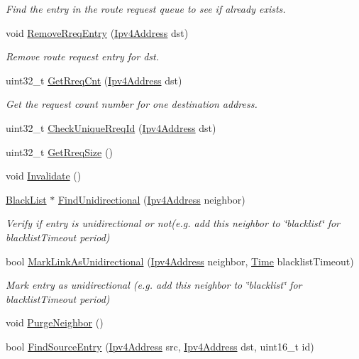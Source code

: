 \begin{DoxyCompactItemize}
\begin{DoxyCompactList}\small\item\em Find the entry in the route request queue to see if already exists. \end{DoxyCompactList}\item 
void \hyperlink{classns3_1_1dsr_1_1DsrRreqTable_a6cb38060b3bfbd31cef7c6ba1e9283df}{Remove\+Rreq\+Entry} (\hyperlink{classns3_1_1Ipv4Address}{Ipv4\+Address} dst)
\begin{DoxyCompactList}\small\item\em Remove route request entry for dst. \end{DoxyCompactList}\item 
uint32\+\_\+t \hyperlink{classns3_1_1dsr_1_1DsrRreqTable_aa84fe40722aca1832a97d7f0cde30b04}{Get\+Rreq\+Cnt} (\hyperlink{classns3_1_1Ipv4Address}{Ipv4\+Address} dst)
\begin{DoxyCompactList}\small\item\em Get the request count number for one destination address. \end{DoxyCompactList}\item 
uint32\+\_\+t \hyperlink{classns3_1_1dsr_1_1DsrRreqTable_a2f632cbef90c4a9f4d17a517d370cd99}{Check\+Unique\+Rreq\+Id} (\hyperlink{classns3_1_1Ipv4Address}{Ipv4\+Address} dst)
\item 
uint32\+\_\+t \hyperlink{classns3_1_1dsr_1_1DsrRreqTable_afea3a2f6533da878d3840df3219fc9b0}{Get\+Rreq\+Size} ()
\item 
void \hyperlink{classns3_1_1dsr_1_1DsrRreqTable_a50ad7d8c4840f2a8cfcc97149739cd4b}{Invalidate} ()
\item 
\hyperlink{structns3_1_1dsr_1_1BlackList}{Black\+List} $\ast$ \hyperlink{classns3_1_1dsr_1_1DsrRreqTable_ace03e175386a30c49d4837c5a266e762}{Find\+Unidirectional} (\hyperlink{classns3_1_1Ipv4Address}{Ipv4\+Address} neighbor)
\begin{DoxyCompactList}\small\item\em Verify if entry is unidirectional or not(e.\+g. add this neighbor to \char`\"{}blacklist\char`\"{} for blacklist\+Timeout period) \end{DoxyCompactList}\item 
bool \hyperlink{classns3_1_1dsr_1_1DsrRreqTable_a9d1db35e25977a32b073342587cdf672}{Mark\+Link\+As\+Unidirectional} (\hyperlink{classns3_1_1Ipv4Address}{Ipv4\+Address} neighbor, \hyperlink{classns3_1_1Time}{Time} blacklist\+Timeout)
\begin{DoxyCompactList}\small\item\em Mark entry as unidirectional (e.\+g. add this neighbor to \char`\"{}blacklist\char`\"{} for blacklist\+Timeout period) \end{DoxyCompactList}\item 
void \hyperlink{classns3_1_1dsr_1_1DsrRreqTable_aca6a498c94d434706539b867033e919e}{Purge\+Neighbor} ()
\item 
bool \hyperlink{classns3_1_1dsr_1_1DsrRreqTable_acddd62b940cd88f092d192776ca60e6b}{Find\+Source\+Entry} (\hyperlink{classns3_1_1Ipv4Address}{Ipv4\+Address} src, \hyperlink{classns3_1_1Ipv4Address}{Ipv4\+Address} dst, uint16\+\_\+t id)
\end{DoxyCompactItemize}

